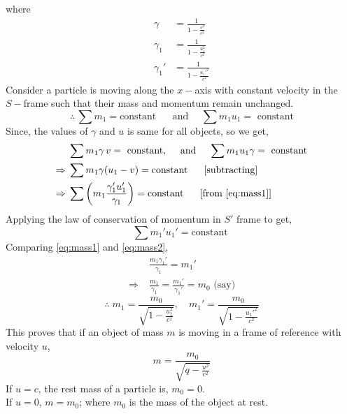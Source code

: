 \documentclass[../main-sheet.tex]{subfiles}
\begin{document}
where
\begin{align*}
    \gamma&=\frac{1}{1-\frac{v^2}{c^2}}\\
    \gamma_1&=\frac{1}{1-\frac{u_1^2}{c^2}}\\
    \gamma_1'&=\frac{1}{1-\frac{{u_1'}^2}{c^2}}
\end{align*}
Consider a particle is moving along the \(x -\)axis with constant velocity in the \(S-\)frame such that their mass and momentum remain unchanged.
\[\therefore\,\sum m_1=\text{constant }\quad\text{ and }\quad \sum m_1u_1=\text{ constant}\]
Since, the values of \(\gamma\) and \(u \) is same for all objects, so we get,
\begin{align*}
    &\sum m_1\gamma\,v=\text{ constant},\quad\text{ and }\quad \sum m_1u_1\gamma=\text{ constant}\\
    \Rightarrow\;&\sum m_1\gamma(u_1-v)=\text{constant }\quad\text{ [subtracting] }\\
    \Rightarrow\;&\sum \left(m_1\frac{\gamma_1'u_1'}{\gamma_1}\right)=\text{constant }\quad\text{ [from \eqref{eq:mass1}] }\\
\end{align*}
Applying the law of conservation of momentum in \(S'\) frame to get,
\begin{equation}
    \sum m_1'u_1'=\text{constant    }\label{eq:mass2}
\end{equation}
Comparing \eqref{eq:mass1} and \eqref{eq:mass2},
\begin{align*}
    & \frac{m_1\gamma_1'}{\gamma_1}=m_1'\\
    \Rightarrow\;& \frac{m_1}{\gamma_1}=\frac{m_1'}{\gamma_1'}=m_0\text{ (say)}
\end{align*}
\[\therefore\; m_1=\frac{m_0}{\sqrt{1-\frac{u_1^2}{c^2}}},\quad m_1'=\frac{m_0}{\sqrt{1-\frac{{u_1'}^2}{c^2}}}\]
This proves that if an object of mass \(m \) is moving in a frame of reference with velocity \(u \),
\[m=\frac{m_0}{\sqrt{q-\frac{u^2}{c^2}}}\]
If \(u=c \), the rest mass of a particle is, \(m_0=0 \).\\
If \(u=0\), \(m=m_0\); where \(m_0\) is the mass of the object at rest.
\end{document}
